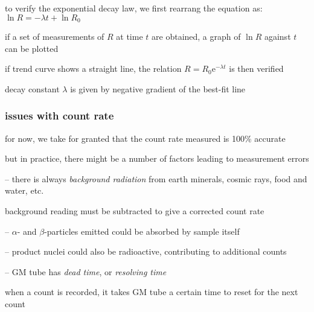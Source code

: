 \begin{wrapfigure}{r}{0.45\textwidth}
	\vspace*{-8pt}
	\centering
	\vspace*{-12pt}
\end{wrapfigure}

to verify the exponential decay law, we first rearrang the equation as: $\ln R = -\lambda t + \ln R_0$

if a set of measurements of $R$ at time $t$ are obtained, a graph of $\ln R$ against $t$ can be plotted

if trend curve shows a straight line, the relation $R=R_0\mathrm{e}^{-\lambda t}$ is then verified

decay constant $\lambda$ is given by negative gradient of the best-fit line

\subsubsection*{issues with count rate}

for now, we take for granted that the count rate measured is 100\% accurate

but in practice, there might be a number of factors leading to measurement errors

\begin{compactenum}
	\item[--] there is always \emph{background radiation} from earth minerals, cosmic rays, food and water, etc.
	
	background reading must be subtracted to give a corrected count rate
	
	\item[--] $\alpha$- and $\beta$-particles emitted could be absorbed by sample itself
	
	\item[--] product nuclei could also be radioactive, contributing to additional counts
	
	\item[--] GM tube has \emph{dead time}, or \emph{resolving time}
	
	when a count is recorded, it takes GM tube a certain time
	to reset for the next count
\end{compactenum}

